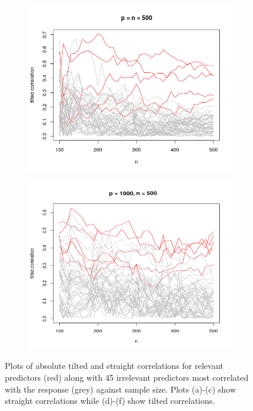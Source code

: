 \documentclass[11pt]{report}\usepackage[utf8]{inputenc}
\begin{document}
\begin{landscape}
\begin{figure}
\begin{subfigure}[b]{0.45\textwidth}
        \includegraphics[width=\textwidth]{../plots/med-dim tilt}
        \caption{}
        \label{fig:tiger}
    \end{subfigure}
        \begin{subfigure}[b]{0.45\textwidth}
        \includegraphics[width=\textwidth]{../plots/high-dim tilt}
        \caption{}
    \end{subfigure}
    \caption{Plots of absolute tilted and straight correlations for relevant predictors (red) along with 45 irrelevant predictors most correlated with the response (grey) against sample size. Plots (a)-(c) show straight correlations while (d)-(f) show tilted correlations.} \label{separation sim}
\end{figure}

\end{landscape}
\end{document}
